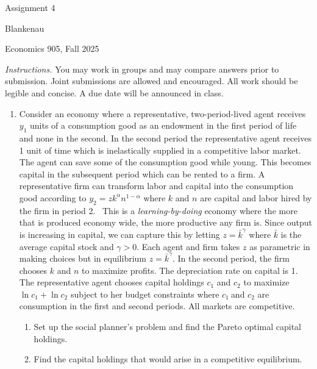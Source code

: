 \documentclass{article}
\begin{document}
\begin{center}
{\LARGE Assignment 4}
\end{center}

\noindent Blankenau

\noindent Economics 905, Fall 2025

\noindent \textit{Instructions.} You may work in groups and may compare
answers prior to submission. Joint submissions are allowed and encouraged.
All work should be legible and concise. A due date will be announced in
class.

\begin{enumerate}
\item Consider an economy where a representative, two-period-lived agent
receives $y_{1}$ units of a consumption good as an endowment in the first
period of life and none in the second. In the second period the
representative agent receives 1 unit of time which is inelastically supplied
in a competitive labor market. The agent can save some of the consumption
good while young. This becomes capital in the subsequent period which can be
rented to a firm. A representative firm can transform labor and capital into
the consumption good according to $y_{2}=zk^{\alpha }n^{1-\alpha }$ where $k$
and $n$ are capital and labor hired by the firm in period 2. \ This is a 
\textit{learning-by-doing} economy where the more that is produced economy
wide, the more productive any firm is. Since output is increasing in
capital, we can capture this by letting $z=\bar{k}^{\gamma }$ where $\bar{k}$
is the average capital stock and $\gamma >0$. Each agent and firm takes $z$
as parametric in making choices but in equilibrium $z=\bar{k}^{\gamma }.$ In
the second period, the firm chooses $k$ and $n$ to maximize profits. The
depreciation rate on capital is 1. The representative agent chooses capital
holdings $c_{1}$ and $c_{2}$ to maximize $\ln c_{1}+\ln c_{2}$ subject to
her budget constraints where $c_{1}\ $and $c_{2}$ are consumption in the
first and second periods. All markets are competitive.

\begin{enumerate}
\item Set up the social planner's problem and find the Pareto optimal
capital holdings.

\item Find the capital holdings that would arise in a competitive
equilibrium.


\end{enumerate}
\end{enumerate}
\end{document}
